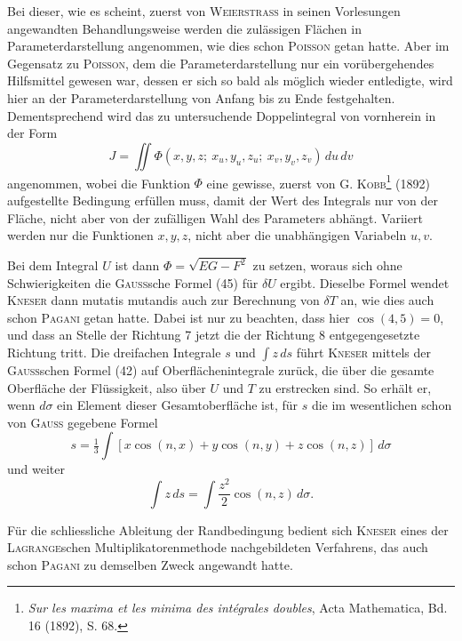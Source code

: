 Bei dieser, wie es scheint, zuerst von \textsc{Weierstrass} in seinen Vorlesungen
angewandten Behandlungsweise werden die zulässigen Flächen in Parameterdarstellung
angenommen, wie dies schon \textsc{Poisson} getan hatte. Aber im Gegensatz
zu \textsc{Poisson}, dem die Parameterdarstellung nur ein vorübergehendes Hilfsmittel
gewesen war, dessen er sich so bald als möglich wieder entledigte, wird
hier an der Parameterdarstellung von Anfang bis zu Ende festgehalten. Dementsprechend
wird das zu untersuchende Doppelintegral von vornherein in
der Form
\[
J=\iint\Phi(x,y,z;\ x_u,y_u,z_u;\ x_v,y_v,z_v)\,du\,dv
\]
angenommen, wobei die Funktion $\Phi$ eine gewisse, zuerst von G. \textsc{Kobb}\footnote{\textit{Sur les maxima et les minima des intégrales doubles}, Acta Mathematica, Bd. 16 (1892), S. 68.} (1892)
aufgestellte Bedingung erfüllen muss, damit der Wert des Integrals nur von
der Fläche, nicht aber von der zufälligen Wahl des Parameters abhängt.
Variiert werden nur die Funktionen $x,y,z$, nicht aber die unabhängigen
Variabeln $u,v$.

Bei dem Integral $U$ ist dann $\Phi=\sqrt{EG-F^2}$ zu setzen, woraus sich ohne
Schwierigkeiten die \textsc{Gauss}sche Formel (45) für $\delta U$ ergibt. Dieselbe Formel
wendet \textsc{Kneser} dann mutatis mutandis auch zur Berechnung von $\delta T$ an, wie
dies auch schon \textsc{Pagani} getan hatte. Dabei ist nur zu beachten, dass hier
$\cos(4,5)=0$, und dass an Stelle der Richtung 7 jetzt die der Richtung 8
entgegengesetzte Richtung tritt. Die dreifachen Integrale $s$ und $\int z\,ds$ führt
\clearpage{}
\noindent \textsc{Kneser} mittels der \textsc{Gauss}schen Formel (42) auf Oberflächenintegrale zurück,
die über die gesamte Oberfläche der Flüssigkeit, also über $U$ und $T$ zu erstrecken
sind. So erhält er, wenn $d\sigma$ ein Element dieser Gesamtoberfläche
ist, für $s$ die im wesentlichen schon von \textsc{Gauss} gegebene Formel
\[
s=\tfrac13\int[x\cos(n,x)+y\cos(n,y)+z\cos(n,z)]\,d\sigma
\]
und weiter
\[
\int z\,ds=\int\frac{z^2}{2}\cos(n,z)\,d\sigma.
\]

Für die schliessliche Ableitung der Randbedingung bedient sich \textsc{Kneser}
eines der \textsc{Lagrange}schen Multiplikatorenmethode nachgebildeten Verfahrens,
das auch schon \textsc{Pagani} zu demselben Zweck angewandt hatte.
\par\clearpage\endgroup

